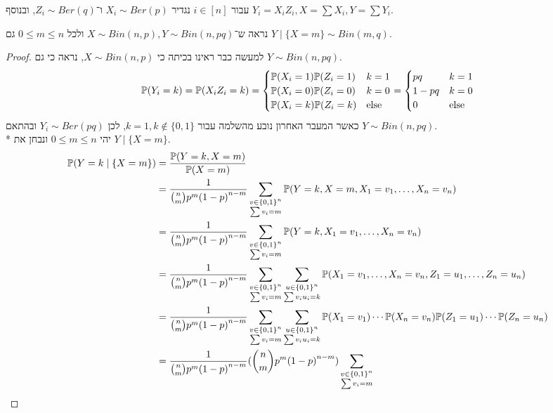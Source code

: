 \question{}
עבור $i \in [n]$ נגדיר $X_i \sim Ber(p)$ ו־$Z_i \sim Ber(q)$, ובנוסף $Y_i = X_i Z_i, X = \sum X_i, Y = \sum Y_i$.

\subquestion{}
נראה ש־$X \sim Bin(n, p), Y \sim Bin(n, pq)$ ולכל $0 \le m \le n$ גם $Y \mid \{X = m\} \sim Bin(m, q)$.
\begin{proof}
	למעשה כבר ראינו בכיתה כי $X \sim Bin(n, p)$, נראה כי גם $Y \sim Bin(n, pq)$.
	\[
		\mathbb{P}(Y_i = k)
		= \mathbb{P}(X_i Z_i = k)
		= \begin{cases}
			\mathbb{P}(X_i = 1) \mathbb{P}(Z_i = 1) & k = 1 \\
			\mathbb{P}(X_i = 0) \mathbb{P}(Z_i = 0) & k = 0 \\
			\mathbb{P}(X_i = k) \mathbb{P}(Z_i = k) & \text{else}
		\end{cases}
		= \begin{cases}
			pq & k = 1 \\
			1 - pq & k = 0 \\
			0 & \text{else}
		\end{cases}
	\]
	כאשר המעבר האחרון נובע מהשלמה עבור $k = 1, k \notin \{0, 1\}$, לכן $Y_i \sim Ber(pq)$ ובהתאם $Y \sim Bin(n, pq)$. \\*
	יהי $0 \le m \le n$ ונבחן את $Y \mid \{X = m\}$.
	\begin{align*}
		\PP(Y = k \mid \{X = m\})
		& = \frac{\PP(Y = k, X = m)}{\PP(X = m)} \\
		& = \frac{1}{\binom{n}{m} p^m {(1 - p)}^{n - m}} \sum_{\substack{v \in {\{0, 1\}}^n \\ \sum v_i = m}} \PP(Y = k, X = m, X_1 = v_1, \dots, X_n = v_n) \\
		& = \frac{1}{\binom{n}{m} p^m {(1 - p)}^{n - m}} \sum_{\substack{v \in {\{0, 1\}}^n \\ \sum v_i = m}} \PP(Y = k, X_1 = v_1, \dots, X_n = v_n) \\
		& = \frac{1}{\binom{n}{m} p^m {(1 - p)}^{n - m}} \sum_{\substack{v \in {\{0, 1\}}^n \\ \sum v_i = m}} \sum_{\substack{u \in {\{0, 1\}}^n \\ \sum v_i u_i = k}} \PP(X_1 = v_1, \dots, X_n = v_n, Z_1 = u_1, \dots, Z_n = u_n) \\
		& = \frac{1}{\binom{n}{m} p^m {(1 - p)}^{n - m}} \sum_{\substack{v \in {\{0, 1\}}^n \\ \sum v_i = m}}
		\sum_{\substack{u \in {\{0, 1\}}^n \\ \sum v_i u_i = k}} \PP(X_1 = v_1) \cdots \PP(X_n = v_n) \PP(Z_1 = u_1) \cdots \PP(Z_n = u_n) \\
		& = \frac{1}{\binom{n}{m} p^m {(1 - p)}^{n - m}} (\binom{n}{m} p^m {(1 - p)}^{n - m}) \sum_{\substack{v \in {\{0, 1\}}^n \\ \sum v_i = m}}

\end{align*}
\end{proof}

